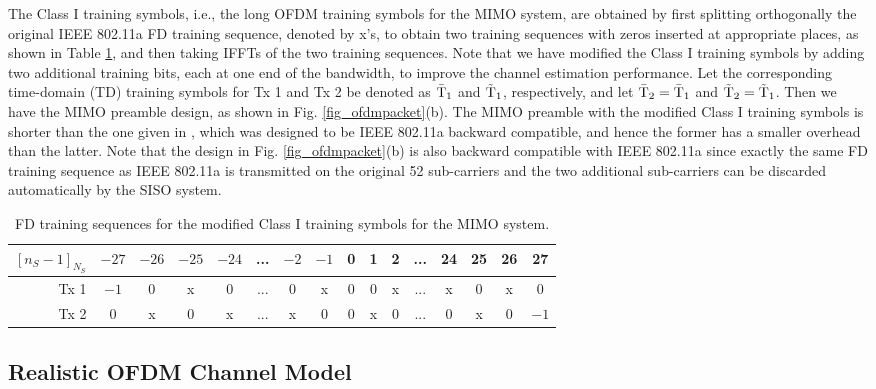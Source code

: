 \documentclass[11pt,draftnofoot,onecolumn]{IEEEtran}
\begin{document}
The Class I training symbols, i.e., the long OFDM training symbols
for the MIMO system, are obtained by first splitting
orthogonally \cite{LarssonLi2001,LiYe2002}
the original IEEE 802.11a FD training sequence,
denoted by x's, to obtain two training sequences with
zeros inserted at appropriate places, as shown in Table \ref{tab_preamble},
and then taking IFFTs of the two training sequences.
Note that we have modified the Class I training symbols by
adding two additional training bits, each at one end of
the bandwidth, to improve the channel estimation performance.
Let the corresponding time-domain (TD) training symbols for
Tx 1 and Tx 2 be denoted as $\bar{\rm T}_1$ and $\tilde{\rm T}_1$, respectively,
and let $\bar{\rm T}_2 = \bar{\rm T}_1$ and $\tilde{\rm T}_2 = \tilde{\rm T}_1$.
Then we have the MIMO preamble design,
as shown in Fig. \ref{fig_ofdmpacket}(b).
The MIMO preamble with the modified Class I training symbols
is shorter than the one given in \cite{LiuLi2003c},
which was designed to be IEEE 802.11a backward compatible,
and hence the former has a smaller overhead than the latter.
Note that
the design in Fig. \ref{fig_ofdmpacket}(b) is also backward compatible with
IEEE 802.11a since exactly the same FD training sequence as
IEEE 802.11a is transmitted on the original 52 sub-carriers and the
two additional sub-carriers can be discarded automatically
by the SISO system.

\begin{table}[t]
\caption{FD training sequences for the modified Class I training
symbols for the MIMO system.}
\label{tab_preamble}
\centering
{\small
\begin{tabular}{r|ccccccccccccccc}
$[n_S-1]_{N_S}$ & $-27$ & $-26$ & $-25$ & $-24$ & ... & $-2$ & $-1$ & 0 & 1 & 2 & ... & 24 & 25 & 26 & 27 \\ \hline
Tx 1 & $-1$ & 0  & x  & 0   & ... & 0  & x  & 0 & 0 & x & ... & x  & 0  & x & 0\\
Tx 2 & 0 & x  & 0  & x    & ... & x  & 0  & 0 & x & 0 & ... & 0  & x  & 0 & $-1$
\end{tabular}
}
\end{table}

\subsection{Realistic OFDM Channel Model}
\end{document}
